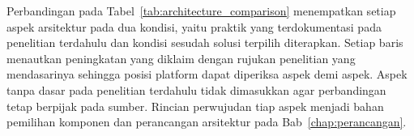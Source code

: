 

Perbandingan pada Tabel~\ref{tab:architecture_comparison} menempatkan setiap aspek arsitektur pada dua kondisi, yaitu praktik yang terdokumentasi pada penelitian terdahulu dan kondisi sesudah solusi terpilih diterapkan. Setiap baris menautkan peningkatan yang diklaim dengan rujukan penelitian yang mendasarinya sehingga posisi platform dapat diperiksa aspek demi aspek. Aspek tanpa dasar pada penelitian terdahulu tidak dimasukkan agar perbandingan tetap berpijak pada sumber. Rincian perwujudan tiap aspek menjadi bahan pemilihan komponen dan perancangan arsitektur pada Bab~\ref{chap:perancangan}.
